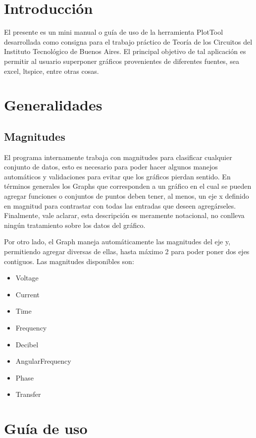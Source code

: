 \documentclass[a4paper,10pt]{article}
\begin{document}
\section{Introducci\'on}
El presente es un mini manual o gu\'ia de uso de la herramienta PlotTool desarrollada como consigna para el trabajo
pr\'actico de Teor\'ia de los Circuitos del Instituto Tecnol\'ogico de Buenos Aires. El principal objetivo de tal aplicaci\'on es permitir al usuario superponer gr\'aficos provenientes de diferentes fuentes, sea excel, ltspice, entre otras cosas.

\section{Generalidades}

\subsection{Magnitudes}
El programa internamente trabaja con magnitudes para clasificar cualquier conjunto de datos, esto es necesario para poder hacer algunos manejos autom\'aticos y validaciones para evitar que los gr\'aficos pierdan sentido.
En t\'erminos generales los Graphs que corresponden a un gr\'afico en el cual se pueden agregar funciones o conjuntos de puntos deben tener, al menos, un eje x definido en magnitud para contrastar con todas las entradas que deseen agreg\'arseles. Finalmente, vale aclarar, esta descripci\'on es meramente notacional, no conlleva ning\'un tratamiento sobre los datos del gr\'afico.

Por otro lado, el Graph maneja autom\'aticamente las magnitudes del eje y, permitiendo agregar diversas de ellas, hasta m\'aximo 2 para poder poner dos ejes contiguos. Las magnitudes disponibles son:
\begin{center}
\begin{itemize}
	\item Voltage
    \item Current
    \item Time
    \item Frequency 
    \item Decibel
    \item AngularFrequency 
    \item Phase
    \item Transfer 
\end{itemize}
\end{center}

\section{Gu\'ia de uso}
\end{document}
